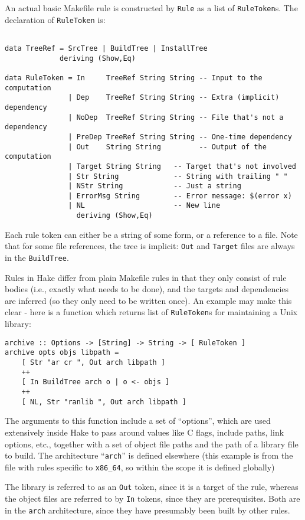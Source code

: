 \documentclass[a4paper,twoside]{report} %
\begin{document}
An actual basic Makefile rule is constructed by \texttt{Rule} as a
list of \texttt{RuleToken}s.  The declaration of \texttt{RuleToken}
is:
\begin{verbatim}

data TreeRef = SrcTree | BuildTree | InstallTree
             deriving (Show,Eq)

data RuleToken = In     TreeRef String String -- Input to the computation
               | Dep    TreeRef String String -- Extra (implicit) dependency
               | NoDep  TreeRef String String -- File that's not a dependency
               | PreDep TreeRef String String -- One-time dependency
               | Out    String String         -- Output of the computation
               | Target String String   -- Target that's not involved
               | Str String             -- String with trailing " "
               | NStr String            -- Just a string
               | ErrorMsg String        -- Error message: $(error x)
               | NL                     -- New line
                 deriving (Show,Eq)
\end{verbatim}
Each rule token can either be a string of some form, or a reference to
a file.   Note that for some file references, the tree is implicit:
\texttt{Out} and \texttt{Target} files are always in the
\texttt{BuildTree}.

Rules in Hake differ from plain Makefile rules in that
they only consist of rule bodies (i.e., exactly what needs to be
done), and the targets and dependencies are inferred (so they only
need to be written once).  An example may make this clear - here is a
function which returns list of \texttt{RuleToken}s for maintaining a
Unix library:
\begin{verbatim}
archive :: Options -> [String] -> String -> [ RuleToken ]
archive opts objs libpath =
    [ Str "ar cr ", Out arch libpath ] 
    ++ 
    [ In BuildTree arch o | o <- objs ]
    ++ 
    [ NL, Str "ranlib ", Out arch libpath ]
\end{verbatim}
The arguments to this function include a set of ``options'', which are
used extensively inside Hake to pass around values like C flags,
include paths, link options, etc., together with a set of object file
paths and the path of a library file to build.  The architecture
``\texttt{arch}'' is defined elsewhere (this example is from the file
with rules specific to \texttt{x86\_64}, so within the scope it is
defined globally)

The library is referred to as an \texttt{Out} token, since it is a target
of the rule, whereas the object files are referred to by \texttt{In}
tokens, since they are prerequisites.   Both are in the \texttt{arch}
architecture, since they have presumably been built by other rules. 
\end{document}
